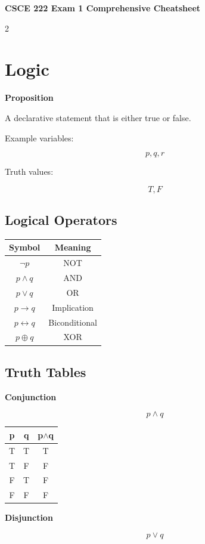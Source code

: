 \documentclass[9pt]{article}
\begin{document}
\begin{center}
{\Large \textbf{CSCE 222 Exam 1 Comprehensive Cheatsheet}}
\end{center}

\begin{multicols}{2}

\section*{Logic}

\textbf{Proposition}

A declarative statement that is either true or false.

Example variables:

\[
p,q,r
\]

Truth values:

\[
T, F
\]

\subsection*{Logical Operators}

\begin{tabular}{c|c}
Symbol & Meaning \\
\hline
$\neg p$ & NOT \\
$p \land q$ & AND \\
$p \lor q$ & OR \\
$p \rightarrow q$ & Implication \\
$p \leftrightarrow q$ & Biconditional \\
$p \oplus q$ & XOR
\end{tabular}

\subsection*{Truth Tables}

\textbf{Conjunction}

\[
p \land q
\]

\begin{tabular}{c c | c}
p & q & p$\land$q\\
\hline
T&T&T\\
T&F&F\\
F&T&F\\
F&F&F
\end{tabular}

\textbf{Disjunction}

\[
p \lor q
\]


\end{multicols}
\end{document}
